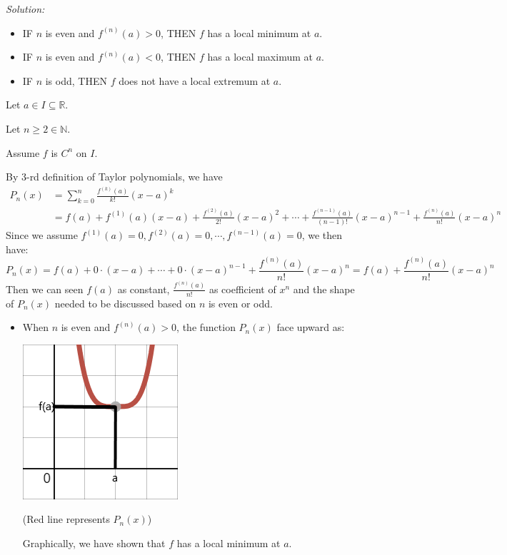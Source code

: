 \documentclass[12pt]{exam}
\newcommand{\R}{\mathbb{R}}
\newcommand{\N}{\mathbb{N}}
\begin{document}
\begin{enumerate}
\begin{enumerate}
		\emph{Solution:}
		    \begin{itemize}
				\item  IF $n$ is even and $f^{(n)}(a)>0$, THEN $f$ has a local minimum at $a$.
				\item  IF $n$ is even and $f^{(n)}(a)<0$, THEN $f$ has a local maximum at $a$.
				\item  IF $n$ is odd, THEN $f$ does not have a local extremum at $a$.
			\end{itemize}
		    Let $a \in I\subseteq\R$.
			
			Let $n\geq2\in\N$.
			
			Assume $f$ is $C^n$ on $I$.
			
			By 3-rd definition of Taylor polynomials, we have
			\begin{align*}
			    P_n(x)&=\sum_{k=0}^n \frac{f^{(k)}(a)}{k!}(x-a)^k\\
			    &=f(a)+f^{(1)}(a)(x-a)+\frac{f^{(2)}(a)}{2!}(x-a)^2+\cdots+\frac{f^{(n-1)}(a)}{(n-1)!}(x-a)^{n-1}+\frac{f^{(n)}(a)}{n!}(x-a)^n
			\end{align*}
			Since we assume $f^{(1)}(a)=0,f^{(2)}(a)=0,\cdots,f^{(n-1)}(a)=0$, we then have:
			$$
			    P_n(x)=f(a)+0\cdot(x-a)+\cdots+0\cdot(x-a)^{n-1}+\frac{f^{(n)}(a)}{n!}(x-a)^n=f(a)+\frac{f^{(n)}(a)}{n!}(x-a)^n
			$$
			Then we can seen $f(a)$ as constant, $\frac{f^{(n)}(a)}{n!}$ as coefficient of $x^n$ and the shape of $P_n(x)$ needed to be discussed based on $n$ is even or odd.
			\begin{itemize}
			    \item When $n$ is even and $f^{(n)}(a)>0$, the function $P_n(x)$ face upward as:
			        \begin{center}
			            \includegraphics[scale=0.75]{Upward-n}
			    
			            (Red line represents $P_n(x)$)
			        \end{center}
			        Graphically, we have shown that $f$ has a local minimum at $a$.
			

\end{itemize}
\end{enumerate}
\end{enumerate}
\end{document}
